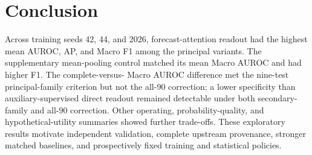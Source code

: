 \section{Conclusion}
Across training seeds 42, 44, and 2026, forecast-attention readout had the highest mean AUROC, AP, and Macro F1 among the principal variants. The supplementary mean-pooling control matched its mean Macro AUROC and had higher F1. The complete-versus-\nojepa{} Macro AUROC difference met the nine-test principal-family criterion but not the all-90 correction; a lower specificity than auxiliary-supervised direct readout remained detectable under both secondary-family and all-90 correction. Other operating, probability-quality, and hypothetical-utility summaries showed further trade-offs. These exploratory results motivate independent validation, complete upstream provenance, stronger matched baselines, and prospectively fixed training and statistical policies.
